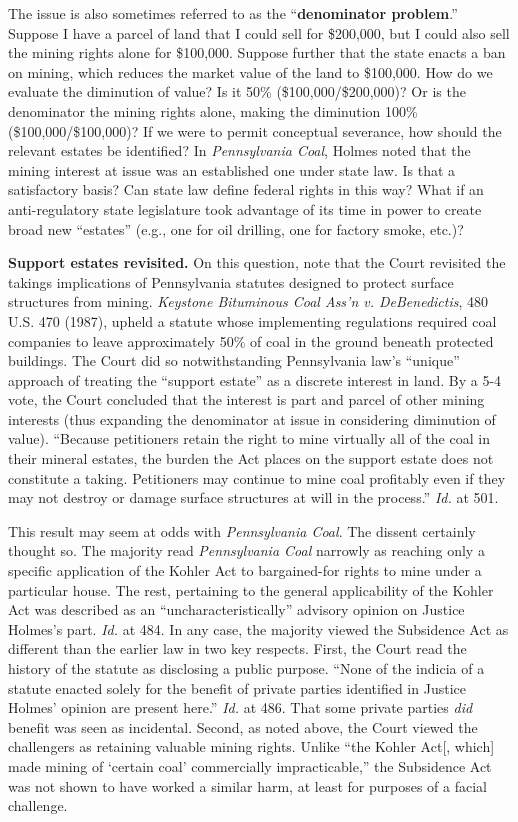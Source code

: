 The issue is also sometimes referred to as the ``\textbf{denominator problem}.''
Suppose I have a parcel of land that I could sell for \$200,000, but I could
also sell the mining rights alone for \$100,000. Suppose further that the state
enacts a ban on mining, which reduces the market value of the land to \$100,000.
How do we evaluate the diminution of value? Is it 50\% (\$100,000/\$200,000)? Or
is the denominator the mining rights alone, making the diminution 100\%
(\$100,000/\$100,000)? If we were to permit conceptual severance, how should the
relevant estates be identified? In \textit{Pennsylvania Coal}, Holmes noted that
the mining interest at issue was an established one under state law. Is that a
satisfactory basis? Can state law define federal rights in this way? What if an
anti-regulatory state legislature took advantage of its time in power to create
broad new ``estates'' (e.g., one for oil drilling, one for factory smoke, etc.)?


\item \textbf{Support estates revisited.} On this question, note that the Court
revisited the takings implications of Pennsylvania statutes designed to protect
surface structures from mining. \textit{Keystone Bituminous Coal Ass'n v.
DeBenedictis}, 480 U.S. 470 (1987), upheld a statute whose implementing
regulations required coal companies to leave approximately 50\% of coal in the
ground beneath protected buildings. The Court did so notwithstanding
Pennsylvania law's ``unique'' approach of treating the ``support estate'' as a
discrete interest in land. By a 5-4 vote, the Court concluded that the interest
is part and parcel of other mining interests (thus expanding the denominator at
issue in considering diminution of value). ``Because petitioners retain the
right to mine virtually all of the coal in their mineral estates, the burden the
Act places on the support estate does not constitute a taking. Petitioners may
continue to mine coal profitably even if they may not destroy or damage surface
structures at will in the process.'' \textit{Id.} at 501. 


This result may seem at odds with \textit{Pennsylvania Coal}. The dissent
certainly thought so. The majority read \textit{Pennsylvania Coal} narrowly as
reaching only a specific application of the Kohler Act to bargained-for rights
to mine under a particular house. The rest, pertaining to the general
applicability of the Kohler Act was described as an ``uncharacteristically''
advisory opinion on Justice Holmes's part. \textit{Id.} at 484. In any case, the
majority viewed the Subsidence Act as different than the earlier law in two key
respects. First, the Court read the history of the statute as disclosing a
public purpose. ``None of the indicia of a statute enacted solely for the
benefit of private parties identified in Justice Holmes' opinion are present
here.'' \textit{Id.} at 486. That some private parties \textit{did} benefit was
seen as incidental. Second, as noted above, the Court viewed the challengers as
retaining valuable mining rights. Unlike ``the Kohler Act[, which] made mining
of `certain coal' commercially impracticable,'' the Subsidence Act was not
shown to have worked a similar harm, at least for purposes of a facial
challenge.



